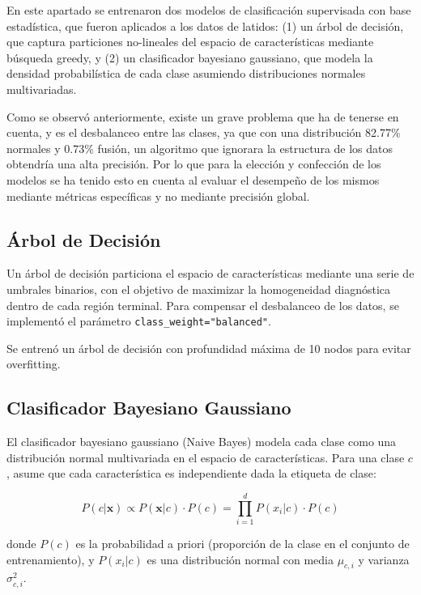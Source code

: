 \documentclass[a4paper,twocolumn]{article}
\begin{document}
	En este apartado se entrenaron dos modelos de clasificación supervisada con base estadística, que fueron aplicados a los datos de latidos: (1) un árbol de decisión, que captura particiones no-lineales del espacio de características mediante búsqueda greedy, y (2) un clasificador bayesiano gaussiano, que modela la densidad probabilística de cada clase asumiendo distribuciones normales multivariadas.
	
	\vspace{0.2cm}

	Como se observó anteriormente, existe un grave problema que ha de tenerse en cuenta, y es el desbalanceo entre las clases, ya que con una distribución 82.77\% normales y 0.73\% fusión, un algoritmo que ignorara la estructura
	de los datos obtendría una alta precisión. Por lo que para la elección y confección de los modelos se ha tenido esto en cuenta al evaluar el desempeño de los mismos mediante métricas específicas
	y no mediante precisión global.

	\subsection{Árbol de Decisión}

	Un árbol de decisión particiona el espacio de características mediante una serie de umbrales binarios, con el objetivo de maximizar la homogeneidad diagnóstica dentro de cada región terminal. 
	Para compensar el desbalanceo de los datos, se implementó el parámetro \texttt{class\_weight="balanced"}.

	\vspace{0.2cm}
	
	Se entrenó un árbol de decisión con profundidad máxima de 10 nodos para evitar overfitting.

	\subsection{Clasificador Bayesiano Gaussiano}

	El clasificador bayesiano gaussiano (Naive Bayes) modela cada clase como una distribución normal multivariada en el espacio de características. Para una clase $c$, asume que cada característica es independiente dada la etiqueta de clase:

	\[
	P(c | \mathbf{x}) \propto P(\mathbf{x} | c) \cdot P(c) = \prod_{i=1}^{d} P(x_i | c) \cdot P(c)
	\]

	donde $P(c)$ es la probabilidad a priori (proporción de la clase en el conjunto de entrenamiento), y $P(x_i | c)$ es una distribución normal con media $\mu_{c,i}$ y varianza $\sigma^2_{c,i}$.
\end{document}
